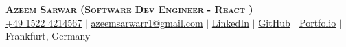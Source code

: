 

\begin{center}
    \textbf{\Huge \scshape Azeem Sarwar \small (Software Dev Engineer - React )} \\ \vspace{3pt}
    \small
    \faMobile \hspace{.5pt} \href{tel:004915224214567}{+49 1522 4214567}
    $|$
    \faAt \hspace{.5pt} \href{mailto:azeemsarwarr1@gmail.com}{azeemsarwarr1@gmail.com}
    $|$
    \faLinkedinSquare \hspace{.5pt} \href{https://www.linkedin.com/in/azeemsarwarr}{LinkedIn}
    $|$
    \faGithub \hspace{.5pt} \href{https://github.com/arasgungore}{GitHub}
    $|$
    \faGlobe \hspace{.5pt} \href{https://azeemsarwar.de}{Portfolio}
    $|$
    \faMapMarker \hspace{.5pt} {Frankfurt, Germany}
\end{center}